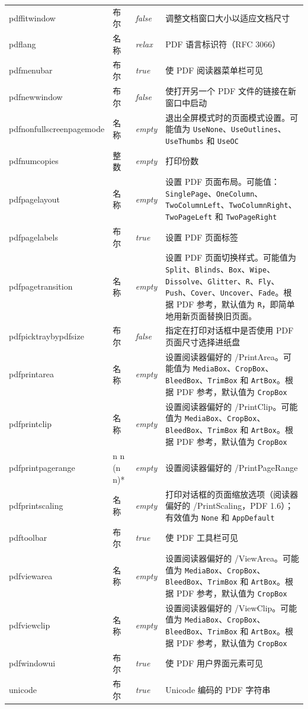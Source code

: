 \documentclass{article}
\begin{document}
\begin{longtable}{@{}>{\ttfamily}l>{\raggedright}p{}>{\itshape}lp{7cm}@{}}
pdffitwindow       & 布尔    & false & 调整文档窗口大小以适应文档尺寸\\
pdflang            & 名称    & relax & PDF 语言标识符（RFC 3066）\\
pdfmenubar         & 布尔    & true  & 使 PDF 阅读器菜单栏可见\\
pdfnewwindow       & 布尔    & false & 使打开另一个 PDF 文件的链接在新窗口中启动\\
pdfnonfullscreenpagemode
                   & 名称    & empty & 退出全屏模式时的页面模式设置。可能值为 \verb|UseNone|、\verb|UseOutlines|、\verb|UseThumbs| 和 \verb|UseOC|\\
pdfnumcopies       & 整数    & empty & 打印份数\\
pdfpagelayout      & 名称    & empty & 设置 PDF 页面布局。可能值：\verb|SinglePage|、\verb|OneColumn|、\verb|TwoColumnLeft|、\verb|TwoColumnRight|、\verb|TwoPageLeft| 和 \verb|TwoPageRight|\\
pdfpagelabels      & 布尔    & true  & 设置 PDF 页面标签\\
pdfpagetransition  & 名称    & empty & 设置 PDF 页面切换样式。可能值为 \verb|Split|、\verb|Blinds|、\verb|Box|、\verb|Wipe|、\verb|Dissolve|、\verb|Glitter|、\verb|R|、\verb|Fly|、\verb|Push|、\verb|Cover|、\verb|Uncover|、\verb|Fade|。根据 PDF 参考，默认值为 \verb|R|，即简单地用新页面替换旧页面。\\
pdfpicktraybypdfsize
                   & 布尔    & false & 指定在打印对话框中是否使用 PDF 页面尺寸选择进纸盘\\
pdfprintarea       & 名称    & empty & 设置阅读器偏好的 /PrintArea。可能值为 \verb|MediaBox|、\verb|CropBox|、\verb|BleedBox|、\verb|TrimBox| 和 \verb|ArtBox|。根据 PDF 参考，默认值为 \verb|CropBox|\\
pdfprintclip       & 名称    & empty & 设置阅读器偏好的 /PrintClip。可能值为 \verb|MediaBox|、\verb|CropBox|、\verb|BleedBox|、\verb|TrimBox| 和 \verb|ArtBox|。根据 PDF 参考，默认值为 \verb|CropBox|\\
pdfprintpagerange  & n n (n n)*
                              & empty & 设置阅读器偏好的 /PrintPageRange\\
pdfprintscaling    & 名称    & empty & 打印对话框的页面缩放选项（阅读器偏好的 /PrintScaling，PDF 1.6）；有效值为 \verb|None| 和 \verb|AppDefault|\\
pdftoolbar         & 布尔    & true  & 使 PDF 工具栏可见\\
pdfviewarea        & 名称    & empty & 设置阅读器偏好的 /ViewArea。可能值为 \verb|MediaBox|、\verb|CropBox|、\verb|BleedBox|、\verb|TrimBox| 和 \verb|ArtBox|。根据 PDF 参考，默认值为 \verb|CropBox|\\
pdfviewclip        & 名称    & empty & 设置阅读器偏好的 /ViewClip。可能值为 \verb|MediaBox|、\verb|CropBox|、\verb|BleedBox|、\verb|TrimBox| 和 \verb|ArtBox|。根据 PDF 参考，默认值为 \verb|CropBox|\\
pdfwindowui        & 布尔    & true  & 使 PDF 用户界面元素可见\\
unicode            & 布尔    & true & Unicode 编码的 PDF 字符串
\end{longtable}
\end{document}
